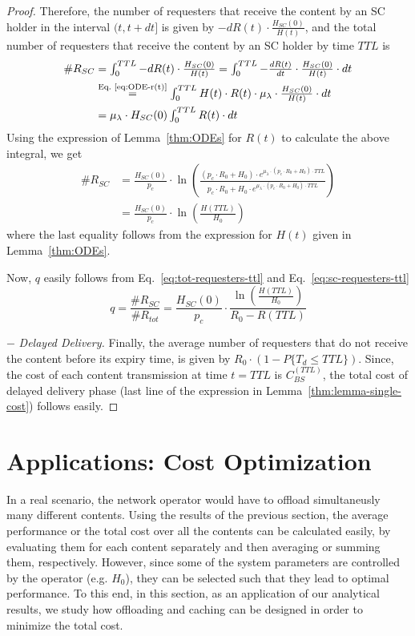 \documentclass[10pt,conference,letterpaper]{IEEEtran}
\newcommand{\eq}[1]{Eq.~\eqref{#1}}
\begin{document}
\begin{proof}
Therefore, the number of requesters that receive the content by an SC holder in the interval $(t,t+dt]$ is given by $-dR(t)\cdot \frac{H_{SC}(0)}{H(t)}$, and the total number of requesters that receive the content by an SC holder by time $TTL$ is
\begin{align}
\#R_{SC}
	&=\textstyle\int_{0}^{TTL} -dR(t)\cdot \frac{H_{SC}(0)}{H(t)} =  \int_{0}^{TTL} -\frac{dR(t)}{dt}\cdot \frac{H_{SC}(0)}{H(t)} \cdot dt\nonumber\\
 	&\stackrel{\text{\eq{eq:ODE-r(t)}}}{=} \textstyle\int_{0}^{TTL} H(t)\cdot R(t)\cdot \mu_{\lambda}\cdot \frac{H_{SC}(0)}{H(t)} \cdot dt\nonumber\\
 	&= \mu_{\lambda}\cdot H_{SC}(0)\textstyle\int_{0}^{TTL} R(t)\cdot dt
\end{align}
Using the expression of Lemma~\ref{thm:ODEs} for $R(t)$ to calculate the above integral, we get
\begin{align}\label{eq:sc-requesters-ttl}
\#R_{SC}
 	&= \frac{H_{SC}(0)}{p_{c}} \cdot \ln\left(\frac{(p_{c}\cdot R_{0}+H_{0})\cdot e^{\mu_{\lambda}\cdot(p_{c}\cdot R_{0}+H_{0})\cdot TTL }}{p_{c}\cdot R_{0}+H_{0}\cdot e^{\mu_{\lambda}\cdot(p_{c}\cdot R_{0}+H_{0})\cdot TTL }}\right)\nonumber\\ 	
 	&= \frac{H_{SC}(0)}{p_{c}} \cdot \ln\left(\frac{H(TTL)}{H_{0}}\right)
\end{align}
where the last equality follows from the expression for $H(t)$ given in Lemma~\ref{thm:ODEs}.

Now, $q$ easily follows from \eq{eq:tot-requesters-ttl} and \eq{eq:sc-requesters-ttl}
\begin{equation}
q = \frac{\#R_{SC}}{\#R_{tot}} = \frac{H_{SC}(0)}{p_{c}} \cdot \frac{\ln\left(\frac{H(TTL)}{H_{0}}\right)}{R_{0}-R(TTL)}
\end{equation}

\noindent$-$ {\textit{Delayed Delivery.}} Finally, the average number of requesters that do not receive the content before its expiry time, is given by $R_{0}\cdot \left(1-P\{T_{d}\leq TTL\}\right)$. Since, the cost of each content transmission at time $t=TTL$ is $C_{BS}^{(TTL)}$, the total cost of delayed delivery phase (last line of the expression in Lemma~\ref{thm:lemma-single-cost}) follows easily.
\end{proof}



\section{Applications: Cost Optimization}\label{sec:single-cost-optimization}
In a real scenario, the network operator would have to offload simultaneusly many different contents. Using the results of the previous section, the average performance or the total cost over all the contents can be calculated easily, by evaluating them for each content separately and then averaging or summing them, respectively. However, since some of the system parameters are controlled by the operator (e.g. $H_{0}$), they can be selected such that they lead to optimal performance. To this end, in this section, as an application of our analytical results, we study how offloading and caching can be designed in order to minimize the total cost.
\end{document}
